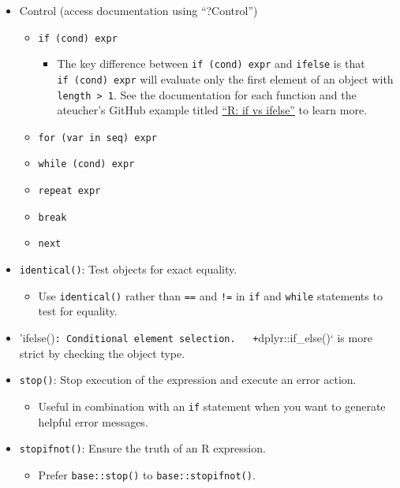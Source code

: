 \documentclass[
]{book}
\providecommand{\tightlist}{%
  \setlength{\itemsep}{0pt}\setlength{\parskip}{0pt}}
\begin{document}
\begin{itemize}
\tightlist
\item
  Control (access documentation using ``?Control'')

  \begin{itemize}
  \tightlist
  \item
    \texttt{if\ (cond)\ expr}

    \begin{itemize}
    \tightlist
    \item
      The key difference between \texttt{if\ (cond)\ expr} and \texttt{ifelse} is that \texttt{if\ (cond)\ expr} will evaluate only the first element of an object with \texttt{length\ \textgreater{}\ 1}. See the documentation for each function and the ateucher's GitHub example titled \href{https://gist.github.com/ateucher/c7359f566eded9fcd4a255f4cbd4fe67}{``R: if vs ifelse''} to learn more.
    \end{itemize}
  \item
    \texttt{for\ (var\ in\ seq)\ expr}
  \item
    \texttt{while\ (cond)\ expr}
  \item
    \texttt{repeat\ expr}
  \item
    \texttt{break}
  \item
    \texttt{next}
  \end{itemize}
\item
  \texttt{identical()}: Test objects for exact equality.

  \begin{itemize}
  \tightlist
  \item
    Use \texttt{identical()} rather than \texttt{==} and \texttt{!=} in \texttt{if} and \texttt{while} statements to test for equality.
  \end{itemize}
\item
  'ifelse()\texttt{:\ Conditional\ element\ selection.\ \ \ +}dplyr::if\_else()` is more strict by checking the object type.
\item
  \texttt{stop()}: Stop execution of the expression and execute an error action.

  \begin{itemize}
  \tightlist
  \item
    Useful in combination with an \texttt{if} statement when you want to generate helpful error messages.
  \end{itemize}
\item
  \texttt{stopifnot()}: Ensure the truth of an R expression.

  \begin{itemize}
  \tightlist
  \item
    Prefer \texttt{base::stop()} to \texttt{base::stopifnot()}.
  \end{itemize}
\end{itemize}
\end{document}
